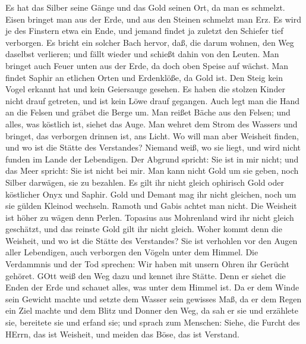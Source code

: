  Es hat das Silber seine Gänge und das Gold seinen Ort, da
man es schmelzt.  Eisen bringet man aus der Erde, und aus
den Steinen schmelzt man Erz.  Es wird je des Finstern etwa
ein Ende, und jemand findet ja zuletzt den Schiefer tief verborgen.
 Es bricht ein solcher Bach hervor, daß, die darum wohnen,
den Weg daselbst verlieren; und fällt wieder und schießt dahin von den
Leuten.  Man bringet auch Feuer unten aus der Erde, da doch
oben Speise auf wächst.  Man findet Saphir an etlichen Orten
und Erdenklöße, da Gold ist.  Den Steig kein Vogel erkannt
hat und kein Geiersauge gesehen.  Es haben die stolzen
Kinder nicht drauf getreten, und ist kein Löwe drauf gegangen.
 Auch legt man die Hand an die Felsen und gräbet die Berge
um.  Man reißet Bäche aus den Felsen; und alles, was
köstlich ist, siehet das Auge.  Man wehret dem Strom des
Wassers und bringet, das verborgen drinnen ist, ans Licht. 
Wo will man aber Weisheit finden, und wo ist die Stätte des Verstandes?
 Niemand weiß, wo sie liegt, und wird nicht funden im Lande
der Lebendigen.  Der Abgrund spricht: Sie ist in mir nicht;
und das Meer spricht: Sie ist nicht bei mir.  Man kann
nicht Gold um sie geben, noch Silber darwägen, sie zu bezahlen.
 Es gilt ihr nicht gleich ophirisch Gold oder köstlicher
Onyx und Saphir.  Gold und Demant mag ihr nicht gleichen,
noch um sie gülden Kleinod wechseln.  Ramoth und Gabis
achtet man nicht. Die Weisheit ist höher zu wägen denn Perlen.
 Topasius aus Mohrenland wird ihr nicht gleich geschätzt,
und das reinste Gold gilt ihr nicht gleich.  Woher kommt
denn die Weisheit, und wo ist die Stätte des Verstandes? 
Sie ist verhohlen vor den Augen aller Lebendigen, auch verborgen den
Vögeln unter dem Himmel.  Die Verdammnis und der Tod
sprechen: Wir haben mit unsern Ohren ihr Gerücht gehöret. 
GOtt weiß den Weg dazu und kennet ihre Stätte.  Denn er
siehet die Enden der Erde und schauet alles, was unter dem Himmel ist.
 Da er dem Winde sein Gewicht machte und setzte dem Wasser
sein gewisses Maß,  da er dem Regen ein Ziel machte und dem
Blitz und Donner den Weg,  da sah er sie und erzählete sie,
bereitete sie und erfand sie;  und sprach zum Menschen:
Siehe, die Furcht des HErrn, das ist Weisheit, und meiden das Böse, das
ist Verstand.

